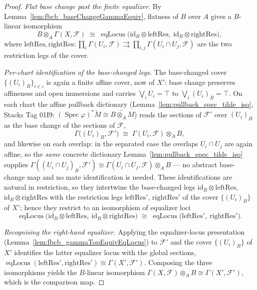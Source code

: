 \begin{theorem}
\begin{proof}
    \emph{Flat base change past the finite equalizer.} By
    Lemma~\ref{lem:fbcb_baseChangeGammaEquiv}, flatness of \(B\) over \(A\) gives a \(B\)-linear
    isomorphism
    \[
      B \otimes_A \Gamma(X,\mathcal{F}) \;\cong\;
        \operatorname{eqLocus}\bigl(\mathrm{id}_B\otimes\mathrm{leftRes},\ \mathrm{id}_B\otimes\mathrm{rightRes}\bigr),
    \]
    where \(\mathrm{leftRes}, \mathrm{rightRes} : \prod_i \Gamma(U_i,\mathcal{F}) \rightrightarrows
    \prod_{i,j}\Gamma(U_i\cap U_j,\mathcal{F})\) are the two restriction legs of the cover.

    \emph{Per-chart identification of the base-changed legs.} The base-changed cover
    \(\{(U_i)_B\}_{i\in\iota}\) is again a finite affine cover, now of \(X'\): base change preserves
    affineness and open immersions and carries \(\bigvee_i U_i = \top\) to \(\bigvee_i (U_i)_B = \top\).
    On each chart the affine pullback dictionary (Lemma~\ref{lem:pullback_spec_tilde_iso}, Stacks
    Tag 01I9: \((\operatorname{Spec}\varphi)^*\widetilde M \cong \widetilde{B\otimes_A M}\)) reads the
    sections of \(\mathcal{F}'\) over \((U_i)_B\) as the base change of the sections of \(\mathcal{F}\),
    \[
      \Gamma\bigl((U_i)_B, \mathcal{F}'\bigr) \;\cong\; \Gamma(U_i,\mathcal{F}) \otimes_A B,
    \]
    and likewise on each overlap: in the separated case the overlaps \(U_i\cap U_j\) are
    again affine, so the \emph{same} concrete dictionary
    Lemma~\ref{lem:pullback_spec_tilde_iso} supplies
    \(\Gamma((U_i\cap U_j)_B, \mathcal{F}') \cong \Gamma(U_i\cap U_j,\mathcal{F})\otimes_A B\)
    — no abstract base-change map and no mate identification is needed. These
    identifications are natural in restriction, so they intertwine the base-changed legs
    \(\mathrm{id}_B\otimes\mathrm{leftRes}\), \(\mathrm{id}_B\otimes\mathrm{rightRes}\) with the
    restriction legs \(\mathrm{leftRes}'\), \(\mathrm{rightRes}'\) of the cover \(\{(U_i)_B\}\) of
    \(X'\); hence they restrict to an isomorphism of equalizer loci
    \[
      \operatorname{eqLocus}\bigl(\mathrm{id}_B\otimes\mathrm{leftRes},\ \mathrm{id}_B\otimes\mathrm{rightRes}\bigr)
      \;\cong\;
      \operatorname{eqLocus}\bigl(\mathrm{leftRes}',\ \mathrm{rightRes}'\bigr).
    \]

    \emph{Recognising the right-hand equalizer.} Applying the equalizer-locus presentation
    (Lemma~\ref{lem:fbcb_gammaTopEquivEqLocus}) to \(\mathcal{F}'\) and the cover \(\{(U_i)_B\}\) of
    \(X'\) identifies the latter equalizer locus with the global sections,
    \(\operatorname{eqLocus}(\mathrm{leftRes}',\mathrm{rightRes}') \cong \Gamma(X',\mathcal{F}')\).
    Composing the three isomorphisms yields the \(B\)-linear isomorphism
    \(\Gamma(X,\mathcal{F})\otimes_A B \cong \Gamma(X',\mathcal{F}')\), which is the comparison map.


\end{proof}
\end{theorem}
